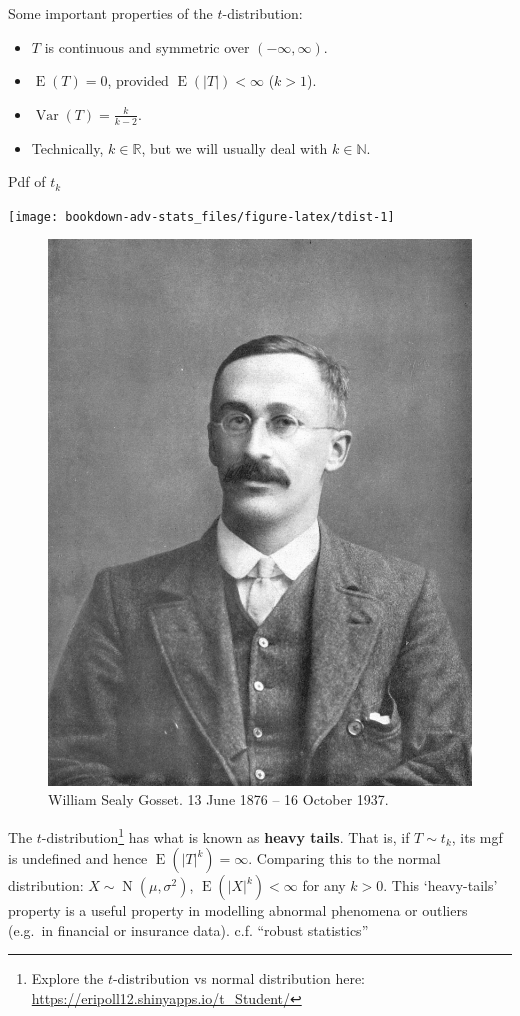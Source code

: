 \documentclass[
]{book}
\providecommand{\tightlist}{%
  \setlength{\itemsep}{0pt}\setlength{\parskip}{0pt}}
\DeclareMathOperator{\E}{E}
\DeclareMathOperator{\Var}{Var}
\DeclareMathOperator{\N}{N}
\newcommand{\bbR}{\mathbb{R}}
\newcommand{\bbN}{\mathbb{N}}
\theoremstyle{definition}
\theoremstyle{definition}
\theoremstyle{definition}
\theoremstyle{definition}
\theoremstyle{remark}
\begin{document}
Some important properties of the \(t\)-distribution:

\begin{itemize}
\tightlist
\item
  \(T\) is continuous and symmetric over \((-\infty,\infty)\).
\item
  \(\E(T)=0\), provided \(\E(|T|) < \infty\) (\(k>1\)).
\item
  \(\Var(T) = \frac{k}{k-2}\).
\item
  Technically, \(k\in\bbR\), but we will usually deal with \(k\in\bbN\).
\end{itemize}

Pdf of \(t_k\)

\begin{center}\texttt{[image: bookdown-adv-stats\_files/figure-latex/tdist-1]} \end{center}

\begin{figure}

{\centering \includegraphics[width=0.6\linewidth]{figure/student} 

}

\caption{William Sealy Gosset. 13 June 1876 -- 16 October 1937.}\label{fig:student}
\end{figure}

The \(t\)-distribution\footnote{Explore the \(t\)-distribution vs normal distribution here:
  \url{https://eripoll12.shinyapps.io/t_Student/}} has what is known as \textbf{heavy tails}.
That is, if \(T\sim t_k\), its mgf is undefined and hence \(\E(|T|^k) = \infty\).
Comparing this to the normal distribution:
\(X\sim\N(\mu,\sigma^2)\), \(\E(|X|^k) < \infty\) for any \(k>0\).
This `heavy-tails' property is a useful property in modelling
abnormal phenomena or outliers (e.g.~in financial or insurance data).
c.f. ``robust statistics''
\end{document}
